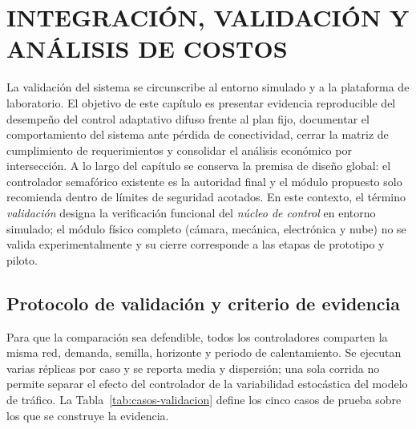 \chapter{INTEGRACIÓN, VALIDACIÓN Y ANÁLISIS DE COSTOS}\label{cap:validacion}

La validación del sistema se circunscribe al entorno simulado y a la plataforma de
laboratorio. El objetivo de este capítulo es presentar evidencia reproducible del
desempeño del control adaptativo difuso frente al plan fijo, documentar el comportamiento
del sistema ante pérdida de conectividad, cerrar la matriz de cumplimiento de requerimientos
y consolidar el análisis económico por intersección. A lo largo del capítulo se conserva la
premisa de diseño global: el controlador semafórico existente es la autoridad final y el
módulo propuesto solo recomienda dentro de límites de seguridad acotados. En este contexto, el término
\emph{validación} designa la verificación funcional del \emph{núcleo de control} en entorno simulado;
el módulo físico completo (cámara, mecánica, electrónica y nube) no se valida experimentalmente y su
cierre corresponde a las etapas de prototipo y piloto.

\section{Protocolo de validación y criterio de evidencia}\label{sec:protocolo-validacion}

Para que la comparación sea defendible, todos los controladores comparten la misma red,
demanda, semilla, horizonte y periodo de calentamiento. Se ejecutan varias réplicas por
caso y se reporta media y dispersión; una sola corrida no permite separar el efecto del
controlador de la variabilidad estocástica del modelo de tráfico. La Tabla~\ref{tab:casos-validacion}
define los cinco casos de prueba sobre los que se construye la evidencia.


